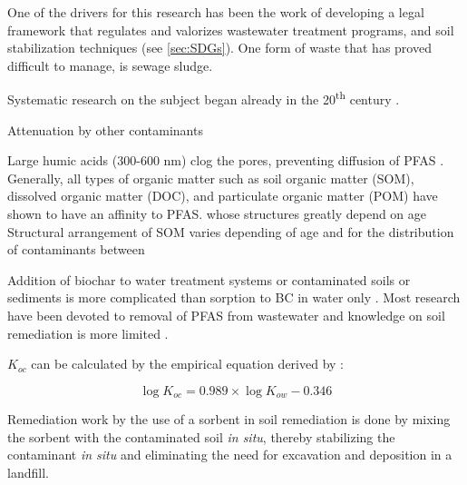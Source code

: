 One of the drivers for this research has been the work of developing a legal framework that regulates and valorizes wastewater treatment programs, and soil stabilization techniques (see \cref{sec:SDGs}).
One form of waste that has proved difficult to manage, is sewage sludge. 

Systematic research on the subject began already in the 20\textsuperscript{th} century \citep{Retan1915}. 

Attenuation by other contaminants


Large humic acids (300-600 nm) clog the pores, preventing diffusion of PFAS \citep{Cornelissen2006,kluvcakova2018size}. 
Generally, all types of organic matter such as soil organic matter (SOM), dissolved organic matter (DOC), and particulate organic matter (POM) have shown to have an affinity to PFAS.
whose structures greatly depend on age 
  Structural arrangement of SOM varies depending of age  and 
for the distribution of contaminants between

Addition of biochar to water treatment systems or contaminated soils or sediments is more complicated than sorption to BC in water only \citep{mahinroosta2020review}. Most research have been devoted to removal of PFAS from wastewater and knowledge on soil remediation is more limited \citep{mahinroosta2020review}.

\(K_{oc}\) can be calculated by the empirical equation derived by \citep{karickhoff1981semi}:

\begin{equation}
    \log K_{oc} = 0.989 \times \log K_{ow} - 0.346
\end{equation}

Remediation work by the use of a sorbent in soil remediation is done by mixing the sorbent with the contaminated soil \textit{in situ}, thereby stabilizing the contaminant \textit{in situ} and eliminating the need for excavation and deposition in a landfill. 
